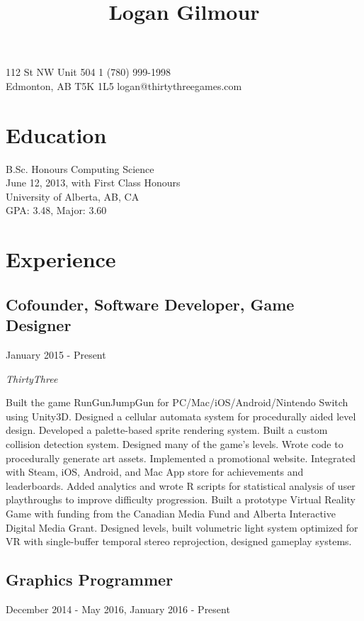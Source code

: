 \documentclass[10pt]{article}
\title{\bfseries\Large Logan Gilmour}
\author{}
\date{}
\begin{document}
\maketitle
{} 112 St NW Unit 504 \hfill 1 (780) 999-1998\\
Edmonton, AB  T5K 1L5 \hfill logan@thirtythreegames.com
\section*{Education}

B.Sc. Honours Computing Science\\
June 12, 2013, with First Class Honours\\
University of Alberta, AB, CA\\
GPA: 3.48, Major: 3.60

\section*{Experience}

\subsection*{Cofounder, Software Developer, Game Designer}
January 2015 - Present

\emph{ThirtyThree}
\vspace{\baselineskip}

Built the game RunGunJumpGun for PC/Mac/iOS/Android/Nintendo Switch using Unity3D. Designed a cellular automata system for procedurally aided level design. Developed a palette-based sprite rendering system. Built a custom collision detection system. Designed many of the game's levels. Wrote code to procedurally generate art assets. Implemented a promotional website. Integrated with Steam, iOS, Android, and Mac App store for achievements and leaderboards. Added analytics and wrote R scripts for statistical analysis of user playthroughs to improve difficulty progression. Built a prototype Virtual Reality Game with funding from the Canadian Media Fund and Alberta Interactive Digital Media Grant. Designed levels, built volumetric light system optimized for VR with single-buffer temporal stereo reprojection, designed gameplay systems.


\subsection*{Graphics Programmer}
December 2014 - May 2016, January 2016 - Present
\end{document}
